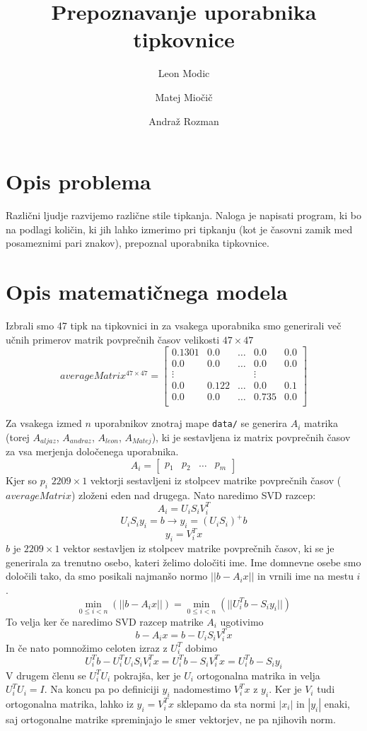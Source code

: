 \documentclass[12pt]{article}
\begin{document}
\title{\textbf{Prepoznavanje uporabnika tipkovnice}}
\author{
  Leon Modic\\
  \and
  Matej Miočič\\
  \and
  Andraž Rozman\\
}
\maketitle

\section{Opis problema}
Različni ljudje razvijemo različne stile tipkanja. Naloga je napisati program,
ki bo na podlagi količin, ki jih lahko izmerimo pri tipkanju (kot je časovni
zamik med posameznimi pari znakov), prepoznal uporabnika tipkovnice.

\section{Opis matematičnega modela}
Izbrali smo 47 tipk na tipkovnici in za vsakega uporabnika smo generirali več učnih
primerov matrik povprečnih časov velikosti $47 \times 47$
\[
  averageMatrix^{47 \times 47}=
  \begin{bmatrix}
    0.1301 & 0.0 & \dots & 0.0 & 0.0\\
    0.0 & 0.0 & \dots & 0.0 & 0.0\\
    \vdots & & & \vdots\\
    0.0 & 0.122 & \dots & 0.0 & 0.1\\
    0.0 & 0.0 & \dots & 0.735 & 0.0\\
  \end{bmatrix}
\]

Za vsakega izmed $n$ uporabnikov znotraj mape \texttt{data/} se generira $A_i$ matrika
(torej $A_{aljaz}$, $A_{andraz}$, $A_{leon}$, $A_{Matej}$), ki je sestavljena iz matrix povprečnih
časov za vsa merjenja določenega uporabnika.
\[
  A_i = \begin{bmatrix}
    p_1 & p_2 & \dots & p_m
  \end{bmatrix}
\]
Kjer so $p_i$ $2209 \times 1$ vektorji sestavljeni iz stolpcev matrike povprečnih časov ($averageMatrix$) zloženi
eden nad drugega. Nato naredimo SVD razcep:
$$A_i=U_iS_iV_i^T$$
$$U_iS_iy_i = b \rightarrow y_i = (U_iS_i)^+b$$
$$y_i = V_i^Tx$$
$b$ je $2209 \times 1$ vektor sestavljen iz stolpcev matrike povprečnih časov, ki se je generirala za trenutno osebo, 
kateri želimo določiti ime. Ime domnevne osebe smo določili tako, da smo posikali najmanšo normo $||b-A_ix||$ in vrnili
ime na mestu $i$.
$$\min\limits_{0\le i<n}(||b-A_ix||) = \min\limits_{0\le i<n}(||U_i^Tb-S_iy_i||)$$
To velja ker če naredimo SVD razcep matrike $A_i$ ugotivimo
$$b-A_ix = b-U_iS_iV_i^Tx$$
In če nato pomnožimo celoten izraz z $U_i^T$ dobimo
$$U_i^Tb-U_i^TU_iS_iV_i^Tx = U_i^Tb-S_iV_i^Tx = U_i^Tb-S_iy_i$$
V drugem členu se $U_i^TU_i$ pokrajša, ker je $U_i$ ortogonalna matrika in velja $U_i^TU_i=I$. Na koncu pa 
po definiciji $y_i$ nadomestimo $V_i^Tx$ z $y_i$. Ker je $V_i$ tudi ortogonalna matrika, lahko iz $y_i = V_i^Tx$
sklepamo da sta normi $|x_i|$ in $|y_i|$ enaki, saj ortogonalne matrike spreminjajo le smer vektorjev, ne  
pa njihovih norm.
\end{document}
